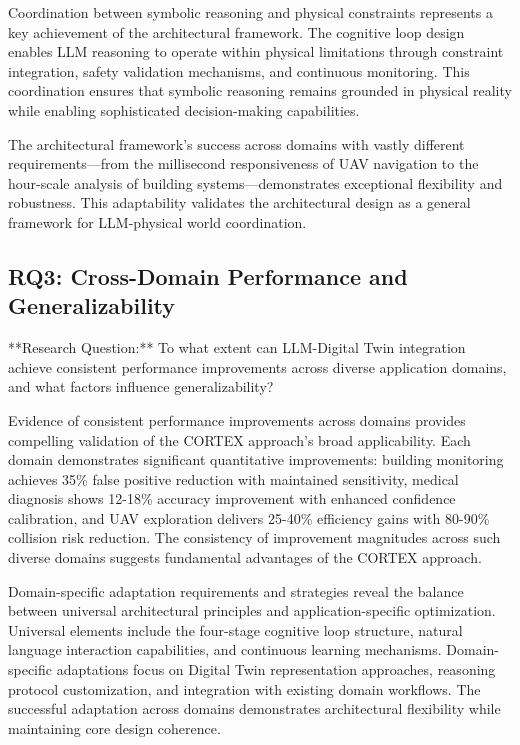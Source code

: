 Coordination between symbolic reasoning and physical constraints represents a key achievement of the architectural framework. The cognitive loop design enables LLM reasoning to operate within physical limitations through constraint integration, safety validation mechanisms, and continuous monitoring. This coordination ensures that symbolic reasoning remains grounded in physical reality while enabling sophisticated decision-making capabilities.

The architectural framework's success across domains with vastly different requirements—from the millisecond responsiveness of UAV navigation to the hour-scale analysis of building systems—demonstrates exceptional flexibility and robustness. This adaptability validates the architectural design as a general framework for LLM-physical world coordination.

\subsection{RQ3: Cross-Domain Performance and Generalizability}

**Research Question:** To what extent can LLM-Digital Twin integration achieve consistent performance improvements across diverse application domains, and what factors influence generalizability?

Evidence of consistent performance improvements across domains provides compelling validation of the CORTEX approach's broad applicability. Each domain demonstrates significant quantitative improvements: building monitoring achieves 35\% false positive reduction with maintained sensitivity, medical diagnosis shows 12-18\% accuracy improvement with enhanced confidence calibration, and UAV exploration delivers 25-40\% efficiency gains with 80-90\% collision risk reduction. The consistency of improvement magnitudes across such diverse domains suggests fundamental advantages of the CORTEX approach.

Domain-specific adaptation requirements and strategies reveal the balance between universal architectural principles and application-specific optimization. Universal elements include the four-stage cognitive loop structure, natural language interaction capabilities, and continuous learning mechanisms. Domain-specific adaptations focus on Digital Twin representation approaches, reasoning protocol customization, and integration with existing domain workflows. The successful adaptation across domains demonstrates architectural flexibility while maintaining core design coherence.

